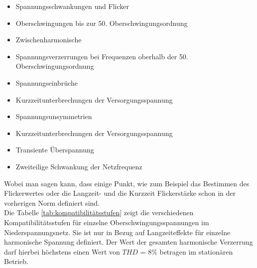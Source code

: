 \begin{appendix}
\begin{itemize}
	\item Spannungsschwankungen und Flicker 
	\item Oberschwingungen bis zur 50. Oberschwingungsordnung
	\item Zwischenharmonische
	\item Spannungsverzerrungen bei Frequenzen oberhalb der 50. Oberschwingungsordnung
	\item Spannungseinbrüche
	\item Kurzzeitunterbrechungen der Versorgungsspannung
	\item Spannungsunsymmetrien
	\item Kurzzeitunterbrechungen der Versorgungsspannung
	\item Transiente Überspannung
	\item Zweiteilige Schwankung der Netzfrequenz
\end{itemize}
Wobei man sagen kann, dass einige Punkt, wie zum Beispiel das Bestimmen des Flickerwertes oder die Langzeit- und die Kurzzeit Flickerstärke schon in der vorherigen Norm definiert sind.\\
Die Tabelle \ref{tab:kompatibilitätsstufen} zeigt die verschiedenen Kompatibilitätsstufen für einzelne Oberschwingungsspannungen im Niederspannungsnetz. Sie ist nur in Bezug auf Langzeiteffekte für einzelne harmonische Spannung definiert. Der Wert der gesamten harmonische Verzerrung darf hierbei höchstens einen Wert von $THD$ = 8\% betragen im stationären Betrieb.
\begin{table}[ht!]
	\centering
\end{table}
\end{appendix}
